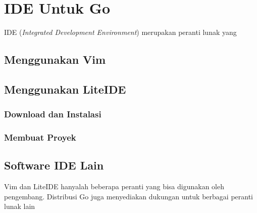 \chapter{IDE Untuk Go}

IDE (\textit{Integrated Development Environment}) merupakan peranti lunak yang 

\section{Menggunakan Vim}



\section{Menggunakan LiteIDE}

\subsection{Download dan Instalasi}


\subsection{Membuat Proyek}


\section{Software IDE Lain}

Vim dan LiteIDE hanyalah beberapa peranti yang bisa digunakan oleh pengembang. Distribusi Go juga menyediakan dukungan untuk berbagai peranti lunak lain
